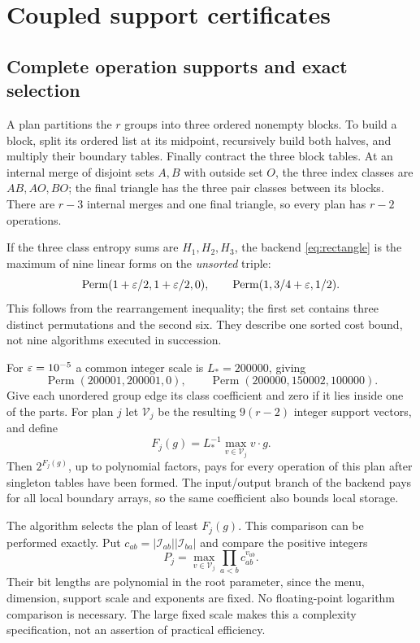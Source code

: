 \section{Coupled support certificates}
\label{sec:certificates}

\subsection{Complete operation supports and exact selection}

A plan partitions the $r$ groups into three ordered nonempty blocks.
To build a block, split its ordered list at its midpoint, recursively
build both halves, and multiply their boundary tables. Finally contract
the three block tables. At an internal merge of disjoint sets $A,B$ with
outside set $O$, the three index classes are $AB,AO,BO$; the final triangle
has the three pair classes between its blocks. There are $r-3$ internal
merges and one final triangle, so every plan has $r-2$ operations.

If the three class entropy sums are $H_1,H_2,H_3$, the backend
\eqref{eq:rectangle} is the maximum of nine linear forms on the
\emph{unsorted} triple:
\begin{equation}\label{eq:newsupports}
 \operatorname{Perm}(1+\varepsilon/2,1+\varepsilon/2,0),\qquad
 \operatorname{Perm}(1,3/4+\varepsilon,1/2).
\end{equation}
This follows from the rearrangement inequality; the first set contains
three distinct permutations and the second six. They describe one sorted
cost bound, not nine algorithms executed in succession.

For $\varepsilon=10^{-5}$ a common integer scale is $L_*=200000$, giving
\[
 \operatorname{Perm}(200001,200001,0),\qquad
 \operatorname{Perm}(200000,150002,100000).
\]
Give each unordered group edge its class coefficient and zero if it lies
inside one of the parts. For plan $j$ let $\mathcal V_j$ be the resulting
$9(r-2)$ integer support vectors, and define
\[
 F_j(g)=L_*^{-1}\max_{v\in\mathcal V_j}v\cdot g.
\]
Then $2^{F_j(g)}$, up to polynomial factors, pays for every operation of
this plan after singleton tables have been formed. The input/output
branch of the backend pays for all local boundary arrays, so the same
coefficient also bounds local storage.

The algorithm selects the plan of least $F_j(g)$. This comparison can be
performed exactly. Put $c_{ab}=|\mathcal I_{ab}||\mathcal I_{ba}|$ and
compare the positive integers
\begin{equation}\label{eq:exactselect}
 P_j=\max_{v\in\mathcal V_j}\prod_{a<b}c_{ab}^{v_{ab}}.
\end{equation}
Their bit lengths are polynomial in the root parameter, since the menu,
dimension, support scale and exponents are fixed. No floating-point
logarithm comparison is necessary. The large fixed scale makes this a
complexity specification, not an assertion of practical efficiency.

